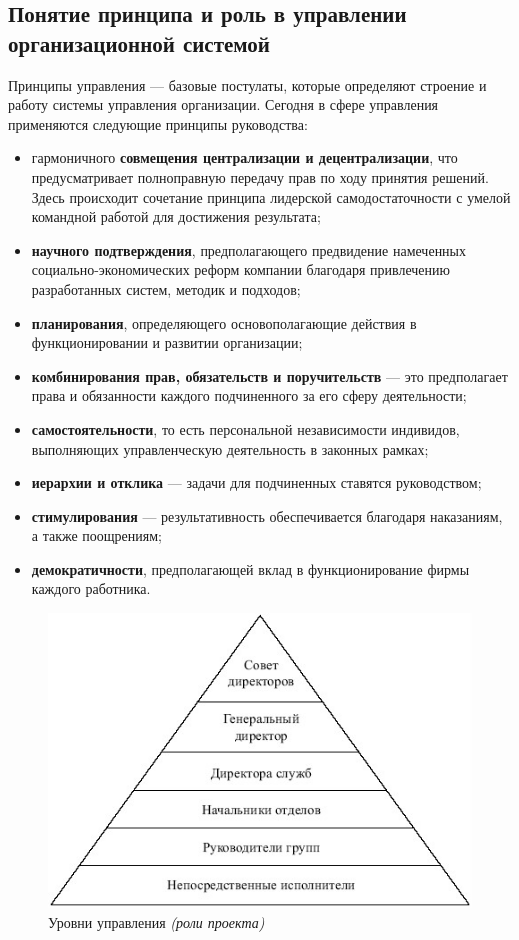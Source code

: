 \documentclass[a4paper,12pt,oneside,final]{extarticle}
\makeatletter
\numberwithin{equation}{section}
\def\maxwidth#1{\ifdim\Gin@nat@width>#1 #1\else\Gin@nat@width\fi}
\makeatother
\begin{document}
\subsection{Понятие принципа и роль в управлении организационной системой}
Принципы управления --- базовые постулаты, которые определяют строение и работу системы управления организации. 
Сегодня в сфере управления применяются следующие принципы руководства: 
\begin{itemize}
	\item гармоничного \textbf{совмещения централизации и децентрализации}, что предусматривает полноправную передачу прав по ходу принятия решений. 
	Здесь происходит сочетание принципа лидерской самодостаточности с умелой командной работой для достижения результата; 
	\item \textbf{научного подтверждения}, предполагающего предвидение намеченных социально-экономических реформ компании благодаря привлечению разработанных систем, методик и подходов; 
	\item \textbf{планирования}, определяющего основополагающие действия в функционировании и развитии организации;
	\item \textbf{комбинирования прав, обязательств и поручительств} --- это предполагает права и обязанности каждого подчиненного за его сферу деятельности; 
	\item \textbf{самостоятельности}, то есть персональной независимости индивидов, выполняющих управленческую деятельность в законных рамках; 
	\item \textbf{иерархии и отклика} --- задачи для подчиненных ставятся руководством; 
	\item \textbf{стимулирования} --- результативность обеспечивается благодаря наказаниям, а также поощрениям;
	\item \textbf{демократичности}, предполагающей вклад в функционирование фирмы каждого работника.
\end{itemize}
\begin{figure}[h]
	\centering
	\includegraphics[width=\maxwidth{\textwidth}]{management-figures/roles_in_organized_systems}
	\caption{Уровни управления \textit{(роли проекта)}}
\end{figure}
\end{document}
